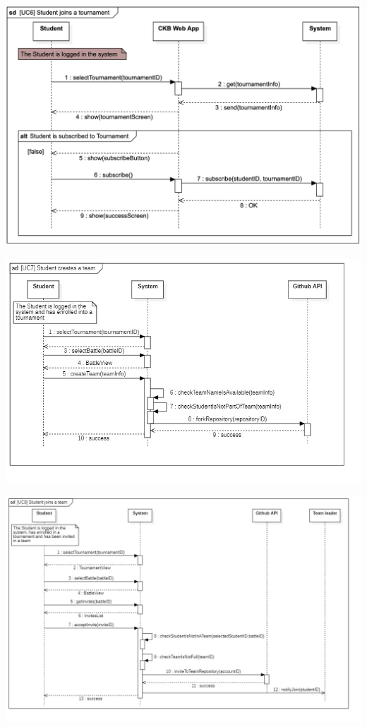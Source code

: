 \documentclass{article}
\begin{document}
\begin{center}
    \includegraphics[width=\linewidth]{image14.png}
  \label{fig:uc6}
\end{center}
\begin{center}
    \includegraphics[width=\linewidth]{uc7.jpg}
  \label{fig:uc7}
\end{center}

\begin{center}
    \includegraphics[width=\linewidth]{uc8.jpg}
  \label{fig:uc8}
\end{center}
\end{document}
